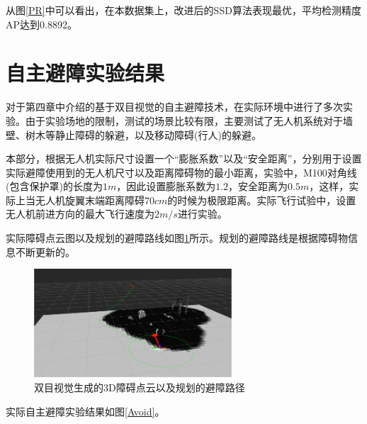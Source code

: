 从图\ref{PR}中可以看出，在本数据集上，改进后的SSD算法表现最优，平均检测精度AP达到0.8892。


\section{自主避障实验结果}

对于第四章中介绍的基于双目视觉的自主避障技术，在实际环境中进行了多次实验。由于实验场地的限制，测试的场景比较有限，主要测试了无人机系统对于墙壁、树木等静止障碍的躲避，以及移动障碍(行人)的躲避。

本部分，根据无人机实际尺寸设置一个“膨胀系数”以及“安全距离”，分别用于设置实际避障使用到的无人机尺寸以及距离障碍物的最小距离，实验中，M100对角线(包含保护罩)的长度为$1m$，因此设置膨胀系数为$1.2$，安全距离为$0.5m$，这样，实际上当无人机旋翼末端距离障碍$70cm$的时候为极限距离。实际飞行试验中，设置无人机前进方向的最大飞行速度为$2m/s$进行实验。

实际障碍点云图以及规划的避障路线如图\ref{3D}所示。规划的避障路线是根据障碍物信息不断更新的。
\begin{figure}[h]
    \centering
    \includegraphics[height=4.05cm]{figures/双目视觉生成的3D障碍点云以及规划的避障路径.png}
    \caption{双目视觉生成的3D障碍点云以及规划的避障路径}\label{3D}
\end{figure}

实际自主避障实验结果如图\ref{Avoid}。
 	 

